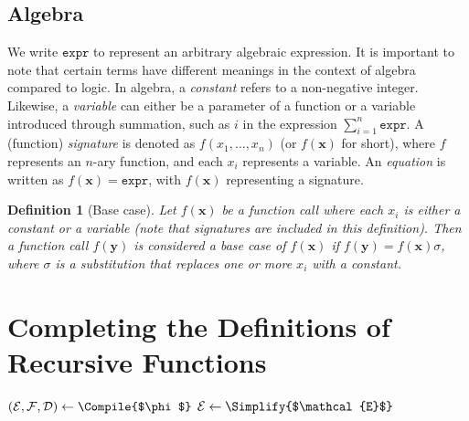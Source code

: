 \documentclass{article}
\newtheorem{definition}{Definition}
\theoremstyle{remark}
\newcommand{\expr}{\mathtt{expr}}
\begin{document}
\subsection{Algebra}\label{sec:algebra}

We write $\expr{}$ to represent an arbitrary algebraic expression. It is
important to note that certain terms have different meanings in the context of
algebra compared to logic. In algebra, a \emph{constant} refers to a
non-negative integer. Likewise, a \emph{variable} can either be a parameter of a
function or a variable introduced through summation, such as $i$ in the
expression $\sum_{i=1}^{n} \expr$. A (function) \emph{signature} is denoted as
$f(x_{1}, \dots, x_{n})$ (or $f(\mathbf{x})$ for short), where $f$ represents an
$n$-ary function, and each $x_{i}$ represents a variable. An \emph{equation} is
written as $f(\mathbf{x}) = \expr{}$, with $f(\mathbf{x})$ representing a
signature.

\begin{definition}[Base case]\label{def:basecase}
  Let $f(\mathbf{x})$ be a function call where each $x_{i}$ is either a constant
  or a variable (note that signatures are included in this definition). Then a
  function call $f(\mathbf{y})$ is considered a \emph{base case} of
  $f(\mathbf{x})$ if $f(\mathbf{y}) = f(\mathbf{x})\sigma$, where $\sigma$ is a
  substitution that replaces one or more $x_{i}$ with a constant.
\end{definition}

\section{Completing the Definitions of Recursive Functions}\label{sec:main}

\begin{algorithm}[t]
  \caption{\protect\CompileWithBaseCases{$\phi$}}\label{alg:compilewithbasecases}
  $(\mathcal{E}, \mathcal{F}, \mathcal{D}) \gets \Compile{$\phi$}$\;\label{line:first}
  $\mathcal{E} \gets \Simplify{$\mathcal{E}$}$\;\label{line:second}
\end{algorithm}
\end{document}

